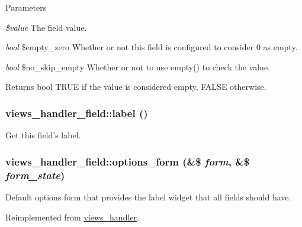 \begin{DoxyParams}{Parameters}
\item[{\em \$value}]The field value. \item[{\em bool}]\$empty\_\-zero Whether or not this field is configured to consider 0 as empty. \item[{\em bool}]\$no\_\-skip\_\-empty Whether or not to use empty() to check the value.\end{DoxyParams}
\begin{DoxyReturn}{Returns}
bool TRUE if the value is considered empty, FALSE otherwise. 
\end{DoxyReturn}
\hypertarget{classviews__handler__field_a57c9be8a5a6a5f447c0320bf1a5378ee}{
\subsubsection[{label}]{\setlength{\rightskip}{0pt plus 5cm}views\_\-handler\_\-field::label ()}}
\label{classviews__handler__field_a57c9be8a5a6a5f447c0320bf1a5378ee}
Get this field's label. \hypertarget{classviews__handler__field_a0435d161922b7b4b84f02a2e79bb947a}{
\subsubsection[{options\_\-form}]{\setlength{\rightskip}{0pt plus 5cm}views\_\-handler\_\-field::options\_\-form (\&\$ {\em form}, \/  \&\$ {\em form\_\-state})}}
\label{classviews__handler__field_a0435d161922b7b4b84f02a2e79bb947a}
Default options form that provides the label widget that all fields should have. 

Reimplemented from \hyperlink{classviews__handler_aa41fcf16b177eb03e35facbae6320f74}{views\_\-handler}.

